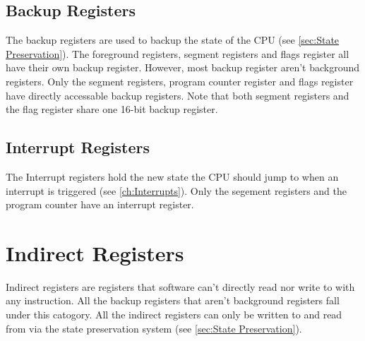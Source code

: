 \documentclass[oneside, a4paper]{memoir}
\begin{document}
\subsection{Backup Registers}
The backup registers are used to backup the state of the CPU (see \autoref{sec:State Preservation}). The foreground registers, segment registers and flags register all have their own backup register. However, most backup register aren't background registers. Only the segment registers, program counter register and flags register have directly accessable backup registers. Note that both segment registers and the flag register share one 16-bit backup register.
\subsection{Interrupt Registers}
The Interrupt registers hold the new state the CPU should jump to when an interrupt is triggered (see \autoref{ch:Interrupts}). Only the segement registers and the program counter have an interrupt register.
\section{Indirect Registers}
Indirect registers are registers that software can't directly read nor write to with any instruction. All the backup registers that aren't background registers fall under this catogory. All the indirect registers can only be written to and read from via the state preservation system (see \autoref{sec:State Preservation}).
\end{document}
